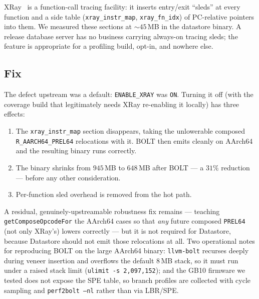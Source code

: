 XRay~\cite{xray} is a function-call tracing facility: it inserts entry/exit
``sleds'' at every function and a side table (\texttt{xray\_instr\_map},
\texttt{xray\_fn\_idx}) of PC-relative pointers into them. We measured these
sections at $\sim\!45$\,MB in the datastore binary. A release database server
has no business carrying always-on tracing sleds; the feature is appropriate
for a profiling build, opt-in, and nowhere else.

\subsection{Fix}

The defect upstream was a default: \texttt{ENABLE\_XRAY} was \texttt{ON}.
Turning it off (with the coverage build that legitimately needs XRay
re-enabling it locally) has three effects:

\begin{enumerate}[leftmargin=1.5em]
  \item The \texttt{xray\_instr\_map} section disappears, taking the
  unlowerable composed \texttt{R\_AARCH64\_PREL64} relocations with it. BOLT
  then emits cleanly on AArch64 and the resulting binary runs correctly.
  \item The binary shrinks from $945$\,MB to $648$\,MB after BOLT --- a $31\%$
  reduction --- before any other consideration.
  \item Per-function sled overhead is removed from the hot path.
\end{enumerate}

A residual, genuinely-upstreamable robustness fix remains --- teaching
\texttt{getComposeOpcodeFor} the AArch64 cases so that \emph{any} future
composed \texttt{PREL64} (not only XRay's) lowers correctly --- but it is not
required for Datastore, because Datastore should not emit those relocations at
all. Two operational notes for reproducing BOLT on the large AArch64 binary:
\texttt{llvm-bolt} recurses deeply during veneer insertion and overflows the
default $8$\,MB stack, so it must run under a raised stack limit
(\texttt{ulimit -s 2{,}097{,}152}); and the GB10 firmware we tested does not
expose the SPE table, so branch profiles are collected with cycle sampling and
\texttt{perf2bolt --nl} rather than via LBR/SPE.
